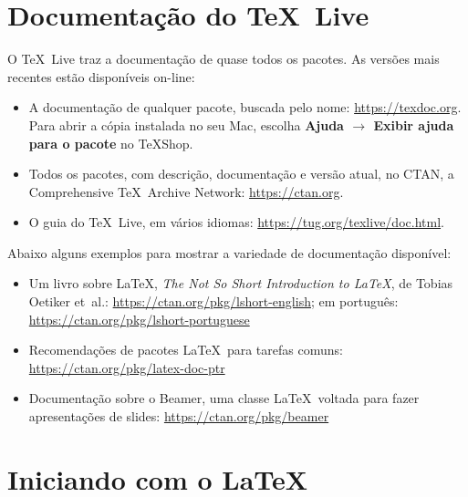 \documentclass[11pt, oneside]{article}
\begin{document}
\pagestyle{empty}

\section{Documentação do \TeX\ Live}

O \TeX\ Live traz a documentação de quase todos os pacotes. As versões mais recentes estão disponíveis on-line:

\begin{itemize}
\item A documentação de qualquer pacote, buscada pelo nome:
\url{https://texdoc.org}. Para abrir a cópia instalada no seu Mac, escolha
\textbf{Ajuda $\rightarrow$ Exibir ajuda para o pacote} no TeXShop.

\item Todos os pacotes, com descrição, documentação e versão atual, no
CTAN, a Comprehensive \TeX\ Archive Network: \url{https://ctan.org}.

\item O guia do \TeX\ Live, em vários idiomas:
\url{https://tug.org/texlive/doc.html}.
\end{itemize}

Abaixo alguns exemplos para mostrar a variedade de documentação disponível:

\begin{itemize}

\item Um livro sobre \LaTeX, \emph{The Not So Short Introduction to \LaTeX}, de Tobias Oetiker et~al.:
\url{https://ctan.org/pkg/lshort-english}; em português: \url{https://ctan.org/pkg/lshort-portuguese}

\item Recomendações de pacotes \LaTeX\ para tarefas comuns: \url{https://ctan.org/pkg/latex-doc-ptr}

\item Documentação sobre o Beamer, uma classe \LaTeX\ voltada para fazer apresentações de slides:
\url{https://ctan.org/pkg/beamer}

\end{itemize}

\section{Iniciando com o \LaTeX}
\end{document}
